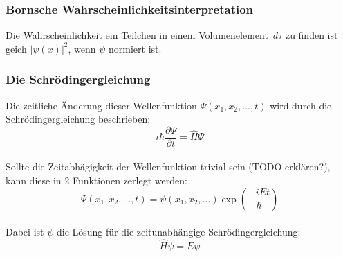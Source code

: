 \subsubsection{Bornsche Wahrscheinlichkeitsinterpretation}
Die Wahrscheinlichkeit ein Teilchen in einem Volumenelement $\,d\tau$ zu finden ist geich
$\vert \psi(x) \vert^2$, wenn $\psi$ normiert ist.\cite[S. 24]{atkins_friedman_2011}

\subsubsection{Die Schrödingergleichung}
Die zeitliche Änderung dieser Wellenfunktion $\Psi(x_1, x_2, \dots, t)$ 
wird durch die Schrödingergleichung beschrieben:
\begin{equation}
  i\hbar\frac{\partial\Psi}{\partial t} = \hat{H}\Psi
\end{equation}\\
Sollte die Zeitabhägigkeit der Wellenfunktion trivial sein (TODO erklären?),
kann diese in 2 Funktionen zerlegt werden:
\begin{equation*}
  \Psi(x_1, x_2, \dots, t) = \psi(x_1, x_2, \dots) \exp(\frac{-iEt}{\hbar})
\end{equation*}\\
Dabei ist $\psi$ die Lösung für die zeitunabhängige Schrödingergleichung:
\begin{equation}\label{schroedinger}
  \hat{H}\psi = E\psi
\end{equation}
\cite[S. 24-25]{atkins_friedman_2011}